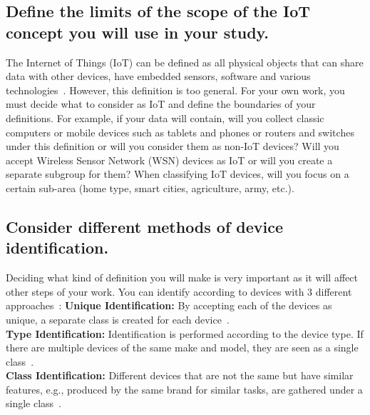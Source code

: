 \documentclass[journal]{IEEEtran}
\begin{document}
\subsection{Define the limits of the scope of the IoT concept you will use in your study.}
The Internet of Things (IoT) can be defined as all physical objects that can share data with other devices, have embedded sensors, software and various technologies~\cite{hussain2020machine}. However, this definition is too general. For your own work, you must decide what to consider as IoT and define the boundaries of your definitions. For example, if your data will contain, will you collect classic computers or mobile devices such as tablets and phones or routers and switches under this definition or will you consider them as non-IoT devices? Will you accept Wireless Sensor Network (WSN) devices as IoT or will you create a separate subgroup for them? When classifying IoT devices, will you focus on a certain sub-area (home type, smart cities, agriculture, army, etc.\@).

\subsection{Consider different methods of device identification.}
Deciding what kind of definition you will make is very important as it will affect other steps of your work. You can  identify according to devices with 3 different approaches~\cite{yadav2020position}:
\textbf{Unique Identification:} By accepting each of the devices as unique, a separate class is created for each device~\cite{hamad2019iot}.\\
\textbf{Type Identification:}  Identification is performed according to the device type. If there are multiple devices of the same make and model, they are seen as a single class~\cite{miettinen2017iot}.\\
\textbf{Class Identification:}  Different devices that are not the same but have similar features, e.g., produced by the same brand for similar tasks, are gathered under a single class~\cite{nguyen2019diot,aksoy2019automated}.
\end{document}
